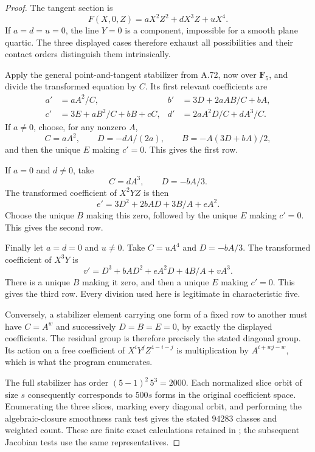 \documentclass[11pt]{article}
\begin{document}
\begin{proof}
The tangent section is
\[
                  F(X,0,Z)=aX^2Z^2+dX^3Z+uX^4.
\]
If $a=d=u=0$, the line $Y=0$ is a component, impossible
for a smooth plane quartic. The three displayed cases
therefore exhaust all possibilities and their contact
orders distinguish them intrinsically.

Apply the general point-and-tangent stabilizer from A.72,
now over $\mathbf F_5$, and divide the transformed equation
by $C$. Its first relevant coefficients are
\[
 \begin{aligned}
 a'&=aA^2/C,&
 b'&=3D+2aAB/C+bA,\\
 c'&=3E+aB^2/C+bB+cC,&
 d'&=2aA^2D/C+dA^3/C.
 \end{aligned}                                                \tag{A.73.1}
\]
If $a\ne0$, choose, for any nonzero $A$,
\[
 C=aA^2,\qquad D=-dA/(2a),\qquad
 B=-A(3D+bA)/2,
\]
and then the unique $E$ making $c'=0$. This gives
the first row.

If $a=0$ and $d\ne0$, take
\[
 C=dA^3,\qquad D=-bA/3.
\]
The transformed coefficient of $X^2YZ$ is then
\[
                   e'=3D^2+2bAD+3B/A+eA^2.
\]
Choose the unique $B$ making this zero, followed by
the unique $E$ making $c'=0$. This gives the second row.

Finally let $a=d=0$ and $u\ne0$. Take
$C=uA^4$ and $D=-bA/3$. The transformed coefficient
of $X^3Y$ is
\[
                 v'=D^3+bAD^2+eA^2D+4B/A+vA^3.
\]
There is a unique $B$ making it zero, and then a unique
$E$ making $c'=0$. This gives the third row. Every
division used here is legitimate in characteristic five.

Conversely, a stabilizer element carrying one form of a
fixed row to another must have $C=A^w$ and successively
$D=B=E=0$, by exactly the displayed coefficients.
The residual group is therefore precisely the stated
diagonal group. Its action on a free coefficient of
$X^iY^jZ^{4-i-j}$ is multiplication by
$A^{i+wj-w}$, which is what the program enumerates.

The full stabilizer has order
$(5-1)^2\,5^3=2000$. Each normalized slice orbit
of size $s$ consequently corresponds to $500s$
forms in the original coefficient space. Enumerating
the three slices, marking every diagonal orbit, and
performing the algebraic-closure smoothness rank test
gives the stated $94283$ classes and weighted count.
These are finite exact calculations retained in
; the subsequent
Jacobian tests use the same representatives.
\end{proof}
\end{document}
